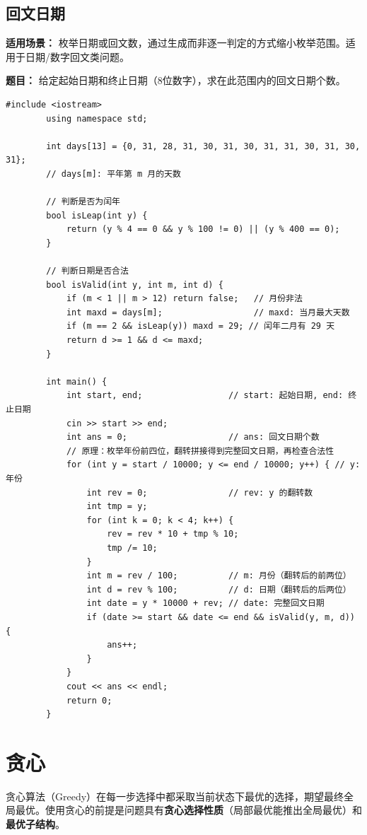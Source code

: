 \documentclass[12pt,a4paper]{ctexart}
\begin{document}
	\subsection{回文日期}
	\textbf{适用场景：} 枚举日期或回文数，通过生成而非逐一判定的方式缩小枚举范围。适用于日期/数字回文类问题。
	
	\textbf{题目：} 给定起始日期和终止日期（8位数字），求在此范围内的回文日期个数。
	
	\begin{lstlisting}[caption={回文日期——枚举前四位生成回文}]
		#include <iostream>
		using namespace std;
		
		int days[13] = {0, 31, 28, 31, 30, 31, 30, 31, 31, 30, 31, 30, 31};
		// days[m]: 平年第 m 月的天数
		
		// 判断是否为闰年
		bool isLeap(int y) {
			return (y % 4 == 0 && y % 100 != 0) || (y % 400 == 0);
		}
		
		// 判断日期是否合法
		bool isValid(int y, int m, int d) {
			if (m < 1 || m > 12) return false;   // 月份非法
			int maxd = days[m];                  // maxd: 当月最大天数
			if (m == 2 && isLeap(y)) maxd = 29; // 闰年二月有 29 天
			return d >= 1 && d <= maxd;
		}
		
		int main() {
			int start, end;                 // start: 起始日期, end: 终止日期
			cin >> start >> end;
			int ans = 0;                    // ans: 回文日期个数
			// 原理：枚举年份前四位，翻转拼接得到完整回文日期，再检查合法性
			for (int y = start / 10000; y <= end / 10000; y++) { // y: 年份
				int rev = 0;                // rev: y 的翻转数
				int tmp = y;
				for (int k = 0; k < 4; k++) {
					rev = rev * 10 + tmp % 10;
					tmp /= 10;
				}
				int m = rev / 100;          // m: 月份（翻转后的前两位）
				int d = rev % 100;          // d: 日期（翻转后的后两位）
				int date = y * 10000 + rev; // date: 完整回文日期
				if (date >= start && date <= end && isValid(y, m, d)) {
					ans++;
				}
			}
			cout << ans << endl;
			return 0;
		}
	\end{lstlisting}
	
	\newpage
	
	\section{贪心}
	贪心算法（Greedy）在每一步选择中都采取当前状态下最优的选择，期望最终全局最优。使用贪心的前提是问题具有\textbf{贪心选择性质}（局部最优能推出全局最优）和\textbf{最优子结构}。
	
\end{document}
